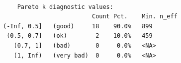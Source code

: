 \documentclass[english,t]{beamer}
\begin{document}
\begin{frame}[fragile]

  \\
  {\scriptsize
\begin{lstlisting}
    Pareto k diagnostic values:
                         Count Pct.    Min. n_eff
(-Inf, 0.5]   (good)     18    90.0%   899       
 (0.5, 0.7]   (ok)        2    10.0%   459       
   (0.7, 1]   (bad)       0     0.0%   <NA>      
   (1, Inf)   (very bad)  0     0.0%   <NA>      
\end{lstlisting}
}

\end{frame}
\end{document}
